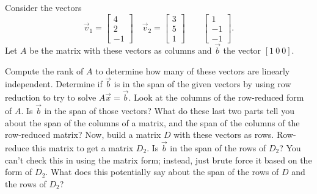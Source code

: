 \begin{exercise}\label{ex:MatReductions}\ansMark%
Consider the vectors
\begin{equation*}
\vec{v}_1 = \begin{bmatrix} 4 \\ 2 \\ -1 \end{bmatrix} \quad \vec{v}_2 = \begin{bmatrix} 3 \\ 5 \\ 1 \end{bmatrix} \qquad \begin{bmatrix} 1 \\ -1 \\ -1 \end{bmatrix}. 
\end{equation*}
Let $A$ be the matrix with these vectors as columns and $\vec{b}$ the vector $[1\ 0 \ 0]$. 
\begin{tasks}
\task Compute the rank of $A$ to determine how many of these vectors are linearly independent.
\task Determine if $\vec{b}$ is in the span of the given vectors by using row reduction to try to solve $A\vec{x} = \vec{b}$.
\task Look at the columns of the row-reduced form of $A$. Is $\vec{b}$ in the span of those vectors?
\task What do these last two parts tell you about the span of the columns of a matrix, and the span of the columns of the row-reduced matrix?
\task Now, build a matrix $D$ with these vectors as rows. Row-reduce this matrix to get a matrix $D_2$. 
\task Is $\vec{b}$ in the span of the rows of $D_2$? You can't check this in using the matrix form; instead, just brute force it based on the form of $D_2$. What does this potentially say about the span of the rows of $D$ and the rows of $D_2$?
\end{tasks}
\end{exercise}
%

